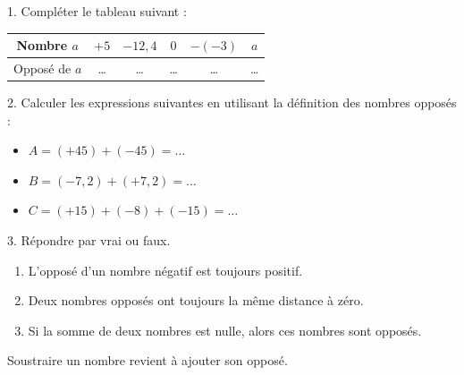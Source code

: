 \documentclass[a4paper]{book}
\begin{document}
        
    \begin{exemple}
        1. Compléter le tableau suivant :
        \begin{center}
        \begin{tabular}{|c|c|c|c|c|c|}
            \hline
            Nombre $a$ & $+5$ & $-12,4$ & $0$ & $-(-3)$ & $a$ \\ \hline
            Opposé de $a$ & \dots & \dots & \dots & \dots & \dots \\ \hline
        \end{tabular}
        \end{center}

        \medskip
    
        \begin{minipage}{0.49\linewidth}
            2. Calculer les expressions suivantes en utilisant la définition des nombres opposés :
            \begin{itemize}
                \item $A = (+45) + (-45) = \dots$

                \smallskip
                
                \item $B = (-7,2) + (+7,2) = \dots$

                \smallskip
                
                \item $C = (+15) + (-8) + (-15) = \dots$

                \smallskip
            \end{itemize}    
        \end{minipage}
        \hfill \vline \hfill
        \begin{minipage}{0.49\linewidth}
            3. Répondre par vrai ou faux.
            \begin{enumerate}
                \item L'opposé d'un nombre négatif est toujours positif.
                \item Deux nombres opposés ont toujours la même distance à zéro.
                \item Si la somme de deux nombres est nulle, alors ces nombres sont opposés.
            \end{enumerate}
        \end{minipage}
    \end{exemple}
    
    
    \begin{propriete} 
        Soustraire un nombre revient à ajouter son opposé.
    \end{propriete}
    
\end{document}
